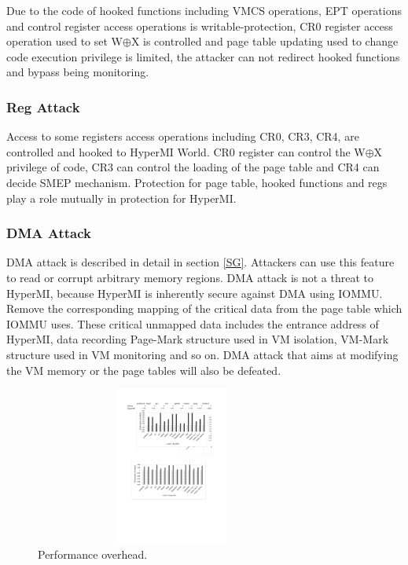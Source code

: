 \documentclass[conference]{IEEEtran}
\begin{document}
Due to the code of hooked functions including VMCS operations, EPT operations and control register access operations is writable-protection, CR0 register access operation used to set W$\oplus${X} is controlled and page table updating used to change code execution privilege is limited, the attacker can not redirect hooked functions and bypass being monitoring.

\subsubsection{Reg Attack}

Access to some registers access operations including CR0, CR3, CR4, are controlled and hooked to HyperMI World. CR0 register can control the W$\oplus${X} privilege of code, CR3 can control the loading of the page table and CR4 can decide SMEP mechanism. Protection for page table, hooked functions and regs play a role mutually in protection for HyperMI. 

\subsubsection{DMA Attack}

 DMA attack is described in detail in section \ref{SG}. Attackers can use this feature to read or corrupt arbitrary memory regions. DMA attack is not a threat to HyperMI, because HyperMI is inherently secure against DMA using IOMMU. Remove the corresponding mapping of the critical data from the page table which IOMMU uses. These critical unmapped data includes the entrance address of HyperMI, data recording Page-Mark structure used in VM isolation, VM-Mark structure used in VM monitoring and so on. DMA attack that aims at modifying the VM memory or the page tables will also be defeated.

\begin{figure}
\centerline{\includegraphics[width=9cm,height=5.2cm]{performance.pdf}}
\caption{Performance overhead.} \label{fig5}
\end{figure}
\end{document}

